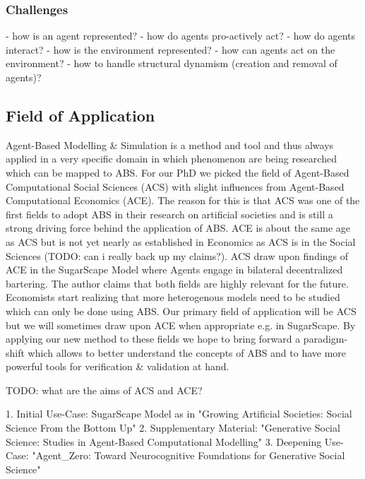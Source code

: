 \subsubsection{Challenges}
- how is an agent represented?
- how do agents pro-actively act?
- how do agents interact?
- how is the environment represented?
- how can agents act on the environment?
- how to handle structural dynamism (creation and removal of agents)?

\subsection{Field of Application}
Agent-Based Modelling \& Simulation is a method and tool and thus always applied in a very specific domain in which phenomenon are being researched which can be mapped to ABS. For our PhD we picked the field of Agent-Based Computational Social Sciences (ACS) with slight influences from Agent-Based Computational Economics (ACE). The reason for this is that ACS was one of the first fields to adopt ABS in their research on artificial societies and is still a strong driving force behind the application of ABS. ACE is about the same age as ACS but is not yet nearly as established in Economics as ACS is in the Social Sciences (TODO: can i really back up my claims?). ACS draw upon findings of ACE in the SugarScape Model where Agents engage in bilateral decentralized bartering. The author claims that both fields are highly relevant for the future. Economists start realizing that more heterogenous models need to be studied which can only be done using ABS.
Our primary field of application will be ACS but we will sometimes draw upon ACE when appropriate e.g. in SugarScape. By applying our new method to these fields we hope to bring forward a paradigm-shift which allows to better understand the concepts of ABS and to have more powerful tools for verification \& validation at hand.

TODO: what are the aims of ACS and ACE?

1. Initial Use-Case: SugarScape Model as in "Growing Artificial Societies: Social Science From the Bottom Up"
2. Supplementary Material: "Generative Social Science: Studies in Agent-Based Computational Modelling"
3. Deepening Use-Case: "Agent\_Zero: Toward Neurocognitive Foundations for Generative Social Science"